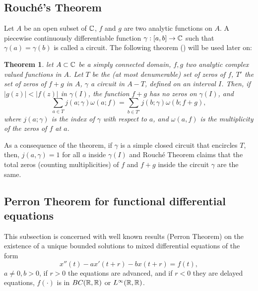 \documentclass[12pt,letterpaper]{amsart}
\newtheorem{theorem}{Theorem}[section]
\theoremstyle{definition}
\theoremstyle{remark}
\numberwithin{equation}{section}
\begin{document}
\subsection{Rouch\' e's Theorem} \label{the rouche}
Let $A$ be an open subset of $\mathbb C$, $f$ and $g$ are two analytic functions on $A$. A piecewise continuously differentiable function $\gamma :[a,b]   \to \mathbb C$ such that $\gamma (a)=\gamma (b)$ is called a circuit. The following theorem (\cite[Rouch\' e's Theorem, p. 247]{die}) will be used later on:
\begin{theorem}
let $A\subset \mathbb C$ be a simply connected domain, $f,g$ two analytic complex valued functions in $A$. Let $T$ be the (at most denumerable) set of zeros of $f$, $T'$ the set of zeros of $f+g$ in $A$, $\gamma$ a circuit in $A- T$, defined on an interval $I$. Then, if $|g(z)| < |f(z)|$ in $\gamma (I)$, the function $f+g$ has no zeros on $\gamma (I)$, and  
\begin{equation}
\sum_{a\in T} j(a;\gamma ) \omega (a;f) =\sum_{b\in T'} j(b;\gamma )\omega (b;f+g),
\end{equation}
where $j(a;\gamma)$ is the index of $\gamma$ with respect to $a$, and $\omega (a,f)$ is the multiplicity of the zeros of $f$ at $a$.
\end{theorem}
As a consequence of the theorem, if $\gamma$ is a simple closed circuit that encircles $T$, then, $j(a,\gamma )=1$ for all $a$ inside $\gamma (I)$ and Rouch\' e Theorem claims that the total zeros (counting multiplicities) of $f$ and $f+g$ inside the circuit $\gamma$ are the same.

\subsection{Perron Theorem for functional differential equations }
This subsection is concerned with well known results (Perron Theorem) on the existence of a unique bounded solutions to mixed differential equations of the form 
\begin{equation}\label{DDE}
x''(t)-ax'(t+r)-bx(t+r)=f(t),
\end{equation}
$a\not=0,b>0$, if $r>0$ the equations are advanced, and if $r<0$ they are delayed equations, $f(\cdot )$ is in $BC(\mathbb R,\mathbb R)$ or $L^\infty(\mathbb R,\mathbb R)$.
\end{document}
